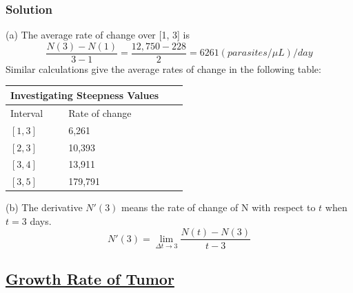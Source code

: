\subsubsection{Solution}

\begin{flushleft}
(a) The average rate of change over [1, 3] is
$$\frac{N(3) - N(1)}{3 - 1} = \frac{12,750 - 228}{2} = 6261 (parasites/\mu L)/day$$
Similar calculations give the average rates of change in the following table:
\end{flushleft}


\begin{tabular}{ |p{3cm}||p{3cm}|p{3cm}|p{3cm}|}
 \hline
 \multicolumn{2}{|c|}{Investigating Steepness Values} \\
 \hline
 Interval & Rate of change\\
 \hline
 $[1, 3]$ & 6,261\\
 $[2, 3]$ & 10,393\\
 $[3, 4]$ & 13,911\\
 $[3, 5]$ & 179,791\\
 \hline
\end{tabular}

\begin{flushleft}
(b) The derivative $N'(3)$ means the rate of change of N with respect to $t$ when $t=3$ days.
	$$
		N'(3) = \lim_{\Delta t \to 3} \frac{N(t) - N(3)}{t - 3}
	$$
\end{flushleft}

\subsection{\href{https://www.slideshare.net/ichazalia/derivative-application-in-medical-and-biology}{Growth Rate of Tumor}}

